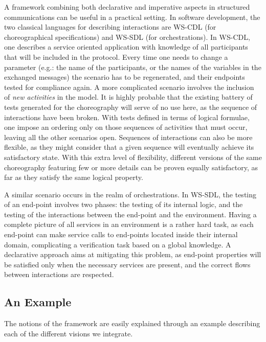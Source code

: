 A framework combining both declarative and imperative aspects in
structured communications can be useful in a practical setting. In
software development, the two classical languages for
describing interactions are WS-CDL \cite{kavantzas2004web} (for choreographical
specifications) and WS-SDL \cite{christensen2001web} (for orchestrations). In WS-CDL, one
describes a service oriented application with knowledge of all
participants that will be included in the protocol. Every time one
needs to change a parameter (e.g.: the name of the participants, or
the names of the variables in the exchanged messages) the scenario has
to be regenerated, and their endpoints tested for compliance again. A
more complicated scenario involves the inclusion of \emph{new
  activities} in the model. It is highly probable that the existing
battery of tests generated for the choreography will serve of no use
here, as the sequence of interactions have been broken. With tests
defined in terms of logical formulae, one impose an ordering only on those
sequences of activities that must occur, leaving all the other
scenarios open. Sequences of interactions can also be more flexible,
as they might consider that a given sequence will eventually achieve
its satisfactory state. With this extra level of flexibility,
different versions of the same choreography featuring few or more
details can be proven equally satisfactory, as far as they satisfy the
same logical property. 

A similar scenario occurs in the realm of
orchestrations. In WS-SDL, the testing of an end-point involves two
phases: the testing of its internal logic, and the testing of the
interactions between the end-point and the environment. Having a
complete picture of all services  in an environment is a
rather hard task, as each end-point can make service calls to end-points
located inside their internal domain, complicating a verification task
based on a global knowledge. A declarative approach aims at mitigating
this problem, as end-point properties will be satisfied only when the
necessary services are present, and the correct flows between
interactions are respected.



\subsection{An Example}

The notions of the framework are easily explained through an example
describing each of the different visions we integrate. 

